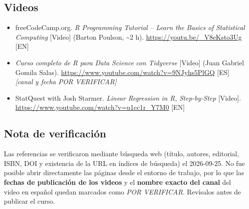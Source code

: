 \subsection*{Videos}

\begin{itemize}
\tightlist
\item
  freeCodeCamp.org. \emph{R Programming Tutorial -- Learn the Basics of
  Statistical Computing} {[}Video{]} (Barton Poulson, \textasciitilde2
  h). \url{https://youtu.be/_V8eKsto3Ug} {[}EN{]}
\item
  \emph{Curso completo de R para Data Science con Tidyverse} {[}Video{]}
  (Juan Gabriel Gomila Salas).
  \url{https://www.youtube.com/watch?v=9NJyhs5PlGQ} {[}ES{]}
  \emph{{[}canal y fecha POR VERIFICAR{]}}
\item
  StatQuest with Josh Starmer. \emph{Linear Regression in R,
  Step-by-Step} {[}Video{]}.
  \url{https://www.youtube.com/watch?v=u1cc1r_Y7M0} {[}EN{]}
\end{itemize}

\subsection*{Nota de verificación}

Las referencias se verificaron mediante búsqueda web (título, autores,
editorial, ISBN, DOI y existencia de la URL en índices de búsqueda) el
2026-09-25. No fue posible abrir directamente las páginas desde el
entorno de trabajo, por lo que las \textbf{fechas de publicación de los
videos} y el \textbf{nombre exacto del canal} del video en español
quedan marcados como \emph{POR VERIFICAR}. Revísalos antes de publicar
el curso.
